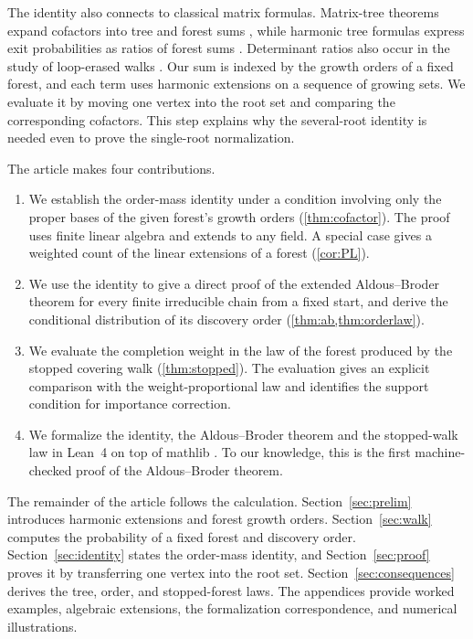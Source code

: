 \documentclass[onefignum,onetabnum]{siamart250211}
\numberwithin{theorem}{section}
\numberwithin{equation}{section}
\begin{document}
The identity also connects to classical matrix formulas. Matrix-tree
theorems expand cofactors into tree and forest sums
\cite{Tutte1948,Chaiken1982}, while harmonic tree formulas express exit
probabilities as ratios of forest sums \cite{PitmanTang2018}.
Determinant ratios also occur in the study of loop-erased walks
\cite{Marchal2000,Fomin2001}. Our sum is indexed by the growth orders
of a fixed forest, and each term uses harmonic extensions on a
sequence of growing sets. We evaluate it by moving one vertex into
the root set and comparing the corresponding cofactors. This step
explains why the several-root identity is needed even to prove the
single-root normalization.

The article makes four contributions.
\begin{enumerate}
\item We establish the order-mass identity under a condition involving
only the proper bases of the given forest's growth orders
(\cref{thm:cofactor}). The proof uses finite linear algebra and extends
to any field. A special case gives a weighted count of the linear
extensions of a forest (\cref{cor:PL}).
\item We use the identity to give a direct proof of the extended
Aldous--Broder theorem for every finite irreducible chain from a fixed
start, and derive the conditional distribution of its discovery
order (\cref{thm:ab,thm:orderlaw}).
\item We evaluate the completion weight in the law of the forest
produced by the stopped covering walk (\cref{thm:stopped}). The
evaluation gives an explicit comparison with the weight-proportional
law and identifies the support condition for importance correction.
\item We formalize the identity, the Aldous--Broder theorem and the
stopped-walk law in Lean~4 \cite{deMouraUllrich2021} on top of mathlib
\cite{mathlib2020}. To our knowledge, this is the first machine-checked
proof of the Aldous--Broder theorem.
\end{enumerate}

The remainder of the article follows the calculation.
Section~\ref{sec:prelim} introduces harmonic extensions and forest
growth orders. Section~\ref{sec:walk} computes the probability of a
fixed forest and discovery order. Section~\ref{sec:identity} states
the order-mass identity, and Section~\ref{sec:proof} proves it by
transferring one vertex into the root set.
Section~\ref{sec:consequences} derives the tree, order, and
stopped-forest laws. The appendices provide worked examples, algebraic
extensions, the formalization correspondence, and numerical
illustrations.
\end{document}
